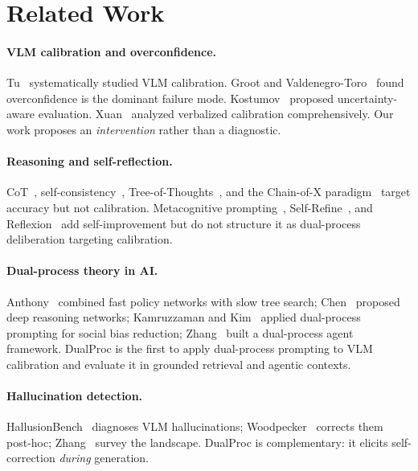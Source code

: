 \documentclass[10pt,twocolumn,letterpaper]{article}
\newcommand{\method}{DualProc}
\begin{document}
\section{Related Work}
\label{sec:related}

\paragraph{VLM calibration and overconfidence.}
Tu~\etal\cite{tu2024empirical} systematically studied VLM calibration.
Groot and Valdenegro-Toro~\cite{groot2024overconfidence} found overconfidence is the dominant failure mode.
Kostumov~\etal\cite{kostumov2024uncertainty} proposed uncertainty-aware evaluation.
Xuan~\etal\cite{xuan2025seeing} analyzed verbalized calibration comprehensively.
Our work proposes an \emph{intervention} rather than a diagnostic.

\paragraph{Reasoning and self-reflection.}
CoT~\cite{wei2022chain}, self-consistency~\cite{wang2023selfconsistency}, Tree-of-Thoughts~\cite{yao2023tree}, and the Chain-of-X paradigm~\cite{qin2024beyond} target accuracy but not calibration.
Metacognitive prompting~\cite{wang2024metacognitive}, Self-Refine~\cite{madaan2023selfrefine}, and Reflexion~\cite{shinn2023reflexion} add self-improvement but do not structure it as dual-process deliberation targeting calibration.

\paragraph{Dual-process theory in AI.}
Anthony~\etal\cite{anthony2017thinking} combined fast policy networks with slow tree search; Chen~\etal\cite{chen2019deep} proposed deep reasoning networks; Kamruzzaman and Kim~\cite{kamruzzaman2024prompting} applied dual-process prompting for social bias reduction; Zhang~\etal\cite{zhang2025leveraging} built a dual-process agent framework.
\method{} is the first to apply dual-process prompting to VLM calibration and evaluate it in grounded retrieval and agentic contexts.

\paragraph{Hallucination detection.}
HallusionBench~\cite{guan2024hallusionbench} diagnoses VLM hallucinations; Woodpecker~\cite{yin2024woodpecker} corrects them post-hoc; Zhang~\etal\cite{zhang2023hallucination_survey} survey the landscape.
\method{} is complementary: it elicits self-correction \emph{during} generation.
\end{document}
